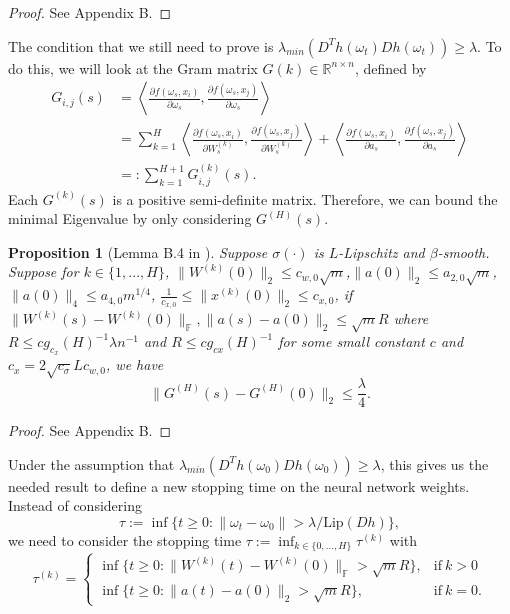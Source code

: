 \documentclass[10pt]{article} %
\newcommand{\bF}{\mathbb{F}}
\newcommand{\bR}{\mathbb{R}}
\newtheorem{proposition}{Proposition}
\begin{document}
    \begin{proof}
        See \cite{du2019gradientdescentfindsglobal} Appendix B.
    \end{proof}
    The condition that we still need to prove is $\lambda_{min}(D^Th(\omega_t)Dh(\omega_t))\geq \lambda$. To do this, we will look at the Gram matrix $G(k)\in\bR^{n\times n}$, defined by 
    \begin{align*}
        G_{i,j}(s)&=\left\langle\frac{\partial f(\omega_s,x_i)}{\partial\omega_s},\frac{\partial f(\omega_s,x_j)}{\partial\omega_s}\right\rangle\\
        &=\sum_{k=1}^H\left\langle\frac{\partial f(\omega_s,x_i)}{\partial W^{(k)}_s},\frac{\partial f(\omega_s,x_j)}{\partial W^{(k)}_s}\right\rangle+\left\langle\frac{\partial f(\omega_s,x_i)}{\partial a_s},\frac{\partial f(\omega_s,x_j)}{\partial a_s}\right\rangle\\\
        &=: \sum_{k=1}^{H+1}G_{i,j}^{(k)}(s).
    \end{align*}
    Each $G^{(k)}(s)$ is a positive semi-definite matrix. Therefore, we can bound the minimal Eigenvalue by only considering $G^{(H)}(s)$. 
    \begin{proposition}[Lemma B.4 in \cite{du2019gradientdescentfindsglobal}]
        Suppose $\sigma(\cdot)$ is $L$-Lipschitz and $\beta$-smooth. Suppose for $k\in\{1,...,H\}$, $\|W^{(k)}(0)\|_2\leq c_{w,0}\sqrt{m}$,$\|a(0)\|_2\leq a_{2,0}\sqrt{m}$,$\|a(0)\|_4\leq a_{4,0}m^{1/4}$, $\frac{1}{c_{x,0}}\leq \|x^{(k)}(0)\|_2\leq c_{x,0}$, if $\|W^{(k)}(s)-W^{(k)}(0)\|_\bF,\|a(s)-a(0)\|_2\leq \sqrt{m}R$ where $R\leq c g_{c_x}(H)^{-1}\lambda n^{-1}$ and $R\leq c g_{cx}(H)^{-1}$ for some small constant $c$ and $c_x=2\sqrt{c_\sigma}Lc_{w,0}$, we have 
        $$\|G^{(H)}(s)-G^{(H)}(0)\|_2\leq \frac{\lambda}{4}.$$
    \end{proposition}
    \begin{proof}
        See \cite{du2019gradientdescentfindsglobal} Appendix B.
    \end{proof}
    Under the assumption that $\lambda_{min}(D^Th(\omega_0)Dh(\omega_0))\geq \lambda$, this gives us the needed result to define a new stopping time on the neural network weights. Instead of considering
    $$\tau:=\inf\{t\geq 0:\|\omega_t-\omega_0\|>\lambda/\text{Lip}(Dh)\},$$
    we need to consider the stopping time $\tau:=\inf_{k\in\{0,...,H\}}\tau^{(k)}$ with
    $$\tau^{(k)}=\begin{cases}
        \inf\{t\geq 0:\|W^{(k)}(t)-W^{(k)}(0)\|_\bF>\sqrt{m}R\}, &  \text{if} \ k>0\\
        \inf\{t\geq 0:\|a(t)-a(0)\|_2>\sqrt{m}R\}, &  \text{if} \ k=0.
    \end{cases}$$
\end{document}

